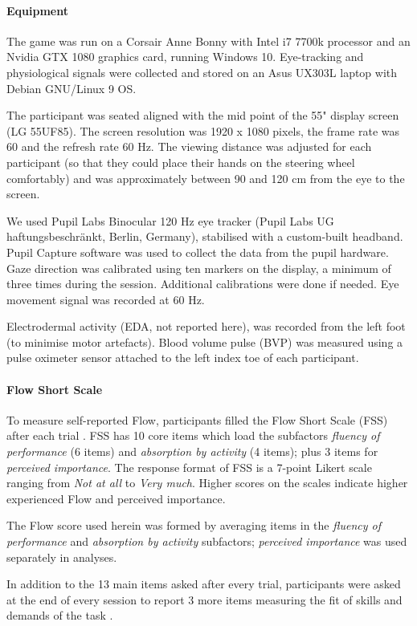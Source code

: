 \paragraph{Equipment} The game was run on a Corsair Anne Bonny with Intel i7 7700k processor and an Nvidia GTX 1080 graphics card, running Windows 10. Eye-tracking and physiological signals were collected and stored on an Asus UX303L laptop with Debian GNU/Linux 9 OS.

The participant was seated aligned with the mid point of the 55" display screen (LG 55UF85). The screen resolution was 1920 x 1080 pixels, the frame rate was 60 and the refresh rate 60 Hz. The viewing distance was adjusted for each participant (so that they could place their hands on the steering wheel comfortably) and was approximately between 90 and 120 cm from the eye to the screen.

We used Pupil Labs Binocular 120 Hz eye tracker (Pupil Labs UG haftungsbeschränkt, Berlin, Germany), stabilised with a custom-built headband. Pupil Capture software was used to collect the data from the pupil hardware. Gaze direction was calibrated using ten markers on the display, a minimum of three times during the session. Additional calibrations were done if needed. Eye movement signal was recorded at 60 Hz.

Electrodermal activity (EDA, not reported here),  was recorded from the left foot (to minimise motor artefacts). Blood volume pulse (BVP) was measured using a pulse oximeter sensor attached to the left index toe of each participant.

\paragraph{Flow Short Scale} To measure self-reported Flow, participants filled the Flow Short Scale (FSS) after each trial \cite{Rheinberg2003,Engeser2008}. FSS has 10 core items which load the subfactors {\it fluency of performance} (6 items) and {\it absorption by activity} (4 items); plus 3 items for {\it perceived importance}. The response format of FSS is a 7-point Likert scale ranging from {\it Not at all} to {\it Very much}. Higher scores on the scales indicate higher experienced Flow and perceived importance.

The Flow score used herein was formed by averaging items in the {\it fluency of performance} and {\it absorption by activity} subfactors; {\it perceived importance} was used separately in analyses.

In addition to the 13 main items asked after every trial, participants were asked at the end of every session to report 3 more items measuring the fit of skills and demands of the task \cite{Rheinberg2003}.

